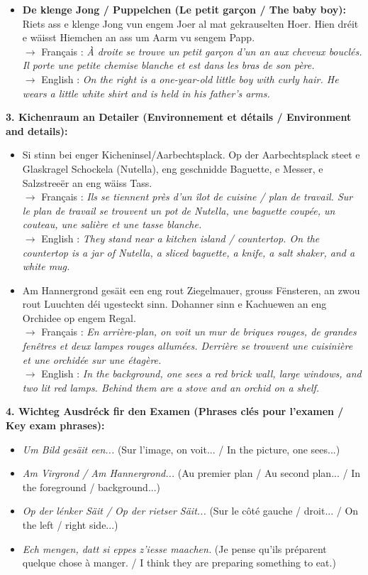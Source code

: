 \begin{itemize}
    \item \textbf{De klenge Jong / Puppelchen (Le petit garçon / The baby boy):} Riets ass e klenge Jong vun engem Joer al mat gekrauselten Hoer. Hien dréit e wäisst Hiemchen an ass um Aarm vu sengem Papp.\\
    $\rightarrow$ Français : \textit{À droite se trouve un petit garçon d'un an aux cheveux bouclés. Il porte une petite chemise blanche et est dans les bras de son père.}\\
    $\rightarrow$ English : \textit{On the right is a one-year-old little boy with curly hair. He wears a little white shirt and is held in his father's arms.}
\end{itemize}

\noindent\textbf{3. Kichenraum an Detailer (Environnement et détails / Environment and details):}
\begin{itemize}
    \item Si stinn bei enger Kicheninsel/Aarbechtsplack. Op der Aarbechtsplack steet e Glaskragel Schockela (Nutella), eng geschnidde Baguette, e Messer, e Salzstreeër an eng wäiss Tass.\\
    $\rightarrow$ Français : \textit{Ils se tiennent près d'un îlot de cuisine / plan de travail. Sur le plan de travail se trouvent un pot de Nutella, une baguette coupée, un couteau, une salière et une tasse blanche.}\\
    $\rightarrow$ English : \textit{They stand near a kitchen island / countertop. On the countertop is a jar of Nutella, a sliced baguette, a knife, a salt shaker, and a white mug.}

    \item Am Hannergrond gesäit een eng rout Ziegelmauer, grouss Fënsteren, an zwou rout Luuchten déi ugesteckt sinn. Dohanner sinn e Kachuewen an eng Orchidee op engem Regal.\\
    $\rightarrow$ Français : \textit{En arrière-plan, on voit un mur de briques rouges, de grandes fenêtres et deux lampes rouges allumées. Derrière se trouvent une cuisinière et une orchidée sur une étagère.}\\
    $\rightarrow$ English : \textit{In the background, one sees a red brick wall, large windows, and two lit red lamps. Behind them are a stove and an orchid on a shelf.}
\end{itemize}

\noindent\textbf{4. Wichteg Ausdréck fir den Examen (Phrases clés pour l'examen / Key exam phrases):}
\begin{itemize}
    \item \textit{Um Bild gesäit een...} (Sur l'image, on voit... / In the picture, one sees...)
    \item \textit{Am Virgrond / Am Hannergrond...} (Au premier plan / Au second plan... / In the foreground / background...)
    \item \textit{Op der lénker Säit / Op der rietser Säit...} (Sur le côté gauche / droit... / On the left / right side...)
    \item \textit{Ech mengen, datt si eppes z'iesse maachen.} (Je pense qu'ils préparent quelque chose à manger. / I think they are preparing something to eat.)
\end{itemize}

